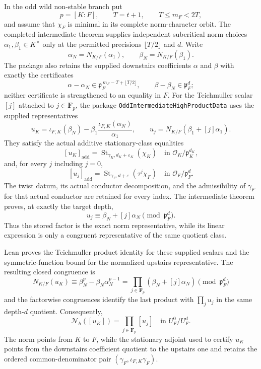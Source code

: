\begin{theorem}
In the odd wild non-stable branch put
\[
 p=[K:F],\qquad T=t+1,
 \qquad T\le m_F<2T,
\]
and assume that $\chi_F$ is minimal in its complete norm-character orbit.
The completed intermediate theorem supplies independent subcritical norm
choices $\alpha_1,\beta_1\in K^\times$ only at the permitted precisions
$\lfloor T/2\rfloor$ and $d$.  Write
\[
 \alpha_N=N_{K/F}(\alpha_1),
 \qquad \beta_N=N_{K/F}(\beta_1).
\]
The package also retains the supplied downstairs coefficients $\alpha$ and
$\beta$ with exactly the certificates
\[
 \alpha-\alpha_N\in
   \mathfrak p_F^{\,m_F-T+\lfloor T/2\rfloor},
 \qquad
 \beta-\beta_N\in\mathfrak p_F^d;
\]
neither certificate is strengthened to an equality in $F$.
For the Teichmuller scalar $[j]$ attached to
$j\in\mathbf F_p$, the package \texttt{OddIntermediateHighProductData}
uses the supplied representatives
\[
 u_K=\iota_{F,K}(\beta_N)
      -\beta_1\frac{\iota_{F,K}(\alpha_N)}{\alpha_1},
 \qquad
 u_j=N_{K/F}(\beta_1+[j]\alpha_1).
\]
They satisfy the actual additive stationary-class equalities
\[
 [u_K]_{\mathrm{add}}
  =\operatorname{St}_{\gamma_K,d_K+\varepsilon_K}(\chi_K)
  \quad\text{in }\mathcal O_K/\mathfrak p_K^{d_K},
\]
and, for every $j$ including $j=0$,
\[
 [u_j]_{\mathrm{add}}
  =\operatorname{St}_{\gamma_F,d+\varepsilon}(\tau^j\chi_F)
  \quad\text{in }\mathcal O_F/\mathfrak p_F^d.
\]
The twist datum, its actual conductor decomposition, and the admissibility
of $\gamma_F$ for that actual conductor are retained for every index.  The
intermediate theorem proves, at exactly the target depth,
\[
 u_j\equiv\beta_N+[j]\alpha_N\pmod{\mathfrak p_F^d}.
\]
Thus the stored factor is the exact norm representative, while its linear
expression is only a congruent representative of the same quotient class.

Lean proves the Teichmuller product identity for
these supplied scalars and the symmetric-function bound for the normalized
upstairs representative.  The resulting closed congruence is
\[
 N_{K/F}(u_K)
  \equiv \beta_N^p-\beta_N\alpha_N^{p-1}
  =\prod_{j\in\mathbf F_p}(\beta_N+[j]\alpha_N)
  \pmod{\mathfrak p_F^d}
\]
and the factorwise congruences identify the last product with
$\prod_j u_j$ in the same depth-$d$ quotient.  Consequently,
\[
 \mathcal N_h([u_K])
   =\prod_{j\in\mathbf F_p}[u_j]
   \quad\text{in }U_F^0/U_F^d.
\]
The norm points from $K$ to $F$, while the stationary adjoint used to
certify $u_K$ points from the downstairs coefficient quotient to the
upstairs one and retains the ordered common-denominator pair
$(\gamma_F,\iota_{F,K}\gamma_F)$.


\end{theorem}
